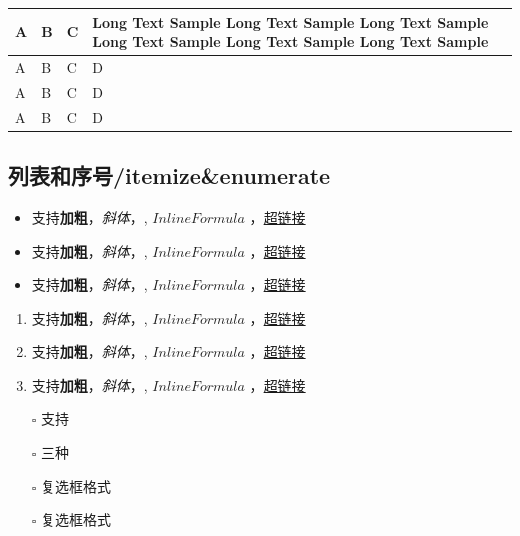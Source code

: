 \documentclass{article}%
\newlength\tablewidth
\begin{document}
%
\begin{center}%
\setlength\tablewidth{\dimexpr (\textwidth -8\tabcolsep)}%
%
%
\begin{tabular}{|p{0.077\tablewidth}<{\centering}|p{0.077\tablewidth}<{\centering}|p{0.077\tablewidth}<{\centering}|p{0.769\tablewidth}<{\centering}|}%
\hline%
\rowcolor{tabletopgray}%
\textbf{A}&\textbf{B}&\textbf{C}&\textbf{Long Text Sample Long Text Sample Long Text Sample Long Text Sample Long Text Sample Long Text Sample }\\%
\hline%
A&B&C&D\\%
\hline%
A&B&C&D\\%
\hline%
A&B&C&D\\%
\hline%
\end{tabular}%
\end{center}%
%

%
\subsection{列表和序号/itemize\&enumerate}%

%
\begin{itemize}%
\item%
支持\textbf{加粗}，\textit{斜体}，, $Inline Formula$ ，\href{www.github.com}{超链接}%
\item%
支持\textbf{加粗}，\textit{斜体}，, $Inline Formula$ ，\href{www.github.com}{超链接}%
\item%
支持\textbf{加粗}，\textit{斜体}，, $Inline Formula$ ，\href{www.github.com}{超链接}%
\end{itemize}%
%

%
\begin{enumerate}%
\item%
支持\textbf{加粗}，\textit{斜体}，, $Inline Formula$ ，\href{www.github.com}{超链接}%
\item%
支持\textbf{加粗}，\textit{斜体}，, $Inline Formula$ ，\href{www.github.com}{超链接}%
\item%
支持\textbf{加粗}，\textit{斜体}，, $Inline Formula$ ，\href{www.github.com}{超链接}%
\end{enumerate}%
%

%
\begin{itemize}%
\item[\rlap{\raisebox{0.3ex}{\hspace{0.4ex}\scriptsize \ding{56}}}$\square$]%
支持%
\item[$\square$]%
三种%
\item[\rlap{\raisebox{0.3ex}{\hspace{0.4ex}\tiny \ding{52}}}$\square$]%
复选框格式%
\item[$\square$]%
复选框格式%
\end{itemize}%
%
\end{document}
